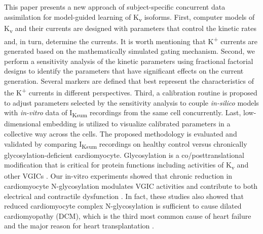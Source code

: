 \documentclass[11pt]{article}
\begin{document}
This paper presents a new approach of subject-specific concurrent data assimilation for model-guided learning of K\textsubscript{v} isoforms. First, computer models of K\textsubscript{v} and their currents are designed with parameters that control the kinetic rates and, in turn, determine the currents. It is worth mentioning that K\textsuperscript{+} currents are generated based on the mathematically simulated gating mechanism. Second, we perform a sensitivity analysis of the kinetic parameters using fractional factorial designs to identify the parameters that have significant effects on the current generation. Several markers are defined that best represent the characteristics of the K\textsuperscript{+} currents in different perspectives. Third, a calibration routine is proposed to adjust parameters selected by the sensitivity analysis to couple \textit{in-silico} models with \textit{in-vitro} data of I\textsubscript{Ksum} recordings from the same cell concurrently. Last, low-dimensional embedding is utilized to visualize calibrated parameters in a collective way across the cells. The proposed methodology is evaluated and validated by comparing I\textsubscript{Ksum} recordings on healthy control versus chronically glycosylation-deficient cardiomyocyte. Glycosylation is a co/posttranslational modification that is critical for protein functions including activities of K\textsubscript{v} and other VGICs \citep{ohtsubo2006glycosylation,ednie2012modulation}. Our in-vitro experiments showed that chronic reduction in cardiomyocyte N-glycosylation modulates VGIC activities and contribute to both electrical and contractile dysfunction \citep{ednie2013sialicNav1,ednie2015sialicKv,ednie2019reduced}. In fact, these studies also showed that reduced cardiomyocyte complex N-glycosylation is sufficient to cause dilated cardiomyopathy (DCM), which is the third most common cause of heart failure and the major reason for heart transplantation \citep{weintraub2017dilated}.
\end{document}
